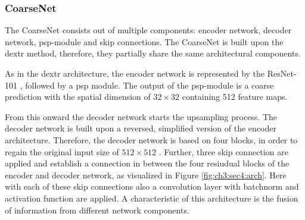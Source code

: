 \subsubsection{CoarseNet}
The CoarseNet consists out of multiple components: encoder network, decoder network, \gls{psp}-module and skip connections. The CoarseNet is built upon the \gls{dextr} method, therefore, they partially share the same architectural components.

As in the \gls{dextr} architecture, the encoder network is represented by the ResNet-101 \cite{He16-ResNet}, followed by a \gls{psp} module.
The output of the \gls{psp}-module is a coarse prediction with the spatial dimension of  $32 \times 32$  containing 512 feature maps. 

From this onward the decoder network starts the upsampling process.
The decoder network is built upon a reversed, simplified version of the encoder architecture. %
Therefore, the decoder network is based on four blocks, in order to regain the original input size of  $512 \times 512$ .
Further, three skip connection are applied and establish a connection in between the four resiudual blocks of the encoder and decoder network, as visualized in Figure \ref{fig:ch3:sec4:arch}.
Here with each of these skip connections also a convolution layer with batchnorm \cite{SS15-Batchnorm} and activation function are applied.
A characteristic of this architecture is the fusion of information from different network components.

